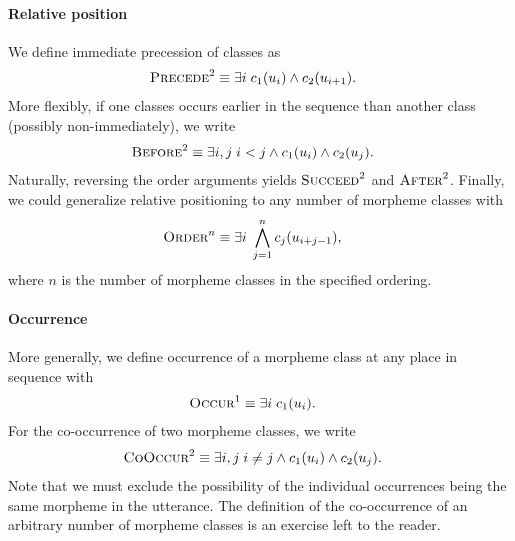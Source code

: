 \paragraph{Relative position}
We define immediate precession of classes as
\begin{align}
  \textsc{Precede}^2 &\equiv \exists i \; c_1(u_i) \wedge c_2(u_{i+1})
  .
\end{align}
More flexibly, if one classes occurs earlier in the sequence than another class (possibly non-immediately), we write
\begin{align}
  \textsc{Before}^2 &\equiv \exists i,j \; i<j \wedge c_1(u_i) \wedge c_2(u_{j})
  .
\end{align}
Naturally, reversing the order arguments yields $\textsc{Succeed}^2$ and $\textsc{After}^2$.
Finally, we could generalize relative positioning to any number of morpheme classes with
\begin{align}
  \textsc{Order}^n &\equiv \exists i \; \bigwedge_{j=1}^n c_j(u_{i+j-1})
  ,
\end{align}
where $n$ is the number of morpheme classes in the specified ordering.

\paragraph{Occurrence}
More generally, we define occurrence of a morpheme class at any place in sequence with
\begin{align}
  \textsc{Occur}^1 &\equiv \exists i \; c_1(u_i)
  .
\end{align}
For the co-occurrence of two morpheme classes, we write
\begin{align}
  \textsc{CoOccur}^2 &\equiv \exists i,j \; i \neq j \wedge c_1(u_i)\wedge c_2(u_j)
  .
\end{align}
Note that we must exclude the possibility of the individual occurrences being the same morpheme in the utterance.
The definition of the co-occurrence of an arbitrary number of morpheme classes is an exercise left to the reader.

